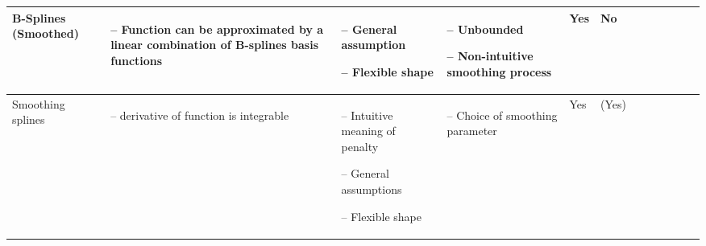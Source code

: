 \begin{table}[!ht]
\begin{tabular}{p{1.6cm}p{3.3cm}p{3.3cm}p{3.4cm}p{0.4cm}p{0.4cm}p{3cm}p{3cm}p{3cm}p{3cm}p{2.7cm}p{3cm}|}
		B-Splines (Smoothed)                                                                                                                                         &
		\begin{cptitemize} \item[--]  Function can be approximated by a linear combination of B-splines basis functions               \end{cptitemize}               &
		\begin{cptitemize} \item[--]  General assumption \item[--]  Flexible shape                                                            \end{cptitemize}        &
		\begin{cptitemize} \item[--]  Unbounded \item[--]  Non-intuitive smoothing process                                                \end{cptitemize}        &
		Yes                                                                                                                                                            &
		No                                            \\ \hline%

		Smoothing splines                                                                                                                                            &
		\begin{cptitemize} \item[--]  \nth{2} derivative of function is integrable                                                        \end{cptitemize}               &
		\begin{cptitemize} \item[--]  Intuitive meaning of penalty \item[--]  General assumptions \item[--]  Flexible shape                         \end{cptitemize} &
		\begin{cptitemize} \item[--]  Choice of smoothing parameter                                                                                       \end{cptitemize}               &
		Yes                                                                                                                                                          &
        (Yes) \\                                                                         


\end{tabular}
\end{table}
